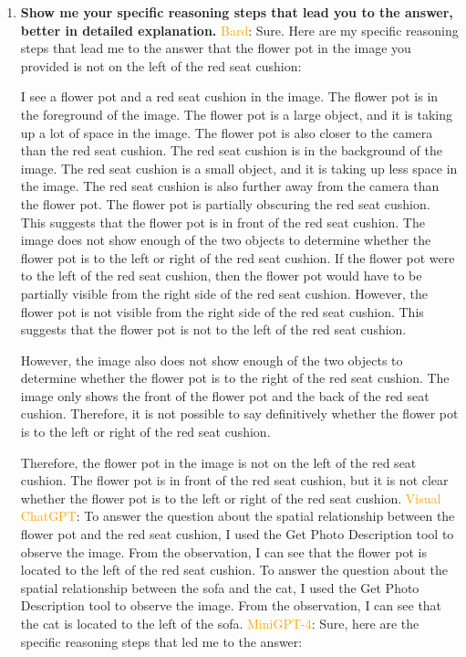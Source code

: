 \begin{enumerate}
    It is possible that the flower pot is to the left of the red seat cushion, but it is also possible that the flower pot is to the right of the red seat cushion. The image does not provide enough information to determine the answer definitively.
    \subitem \textcolor{orange}{Visual ChatGPT}: Yes, the flower pot is on the left of the red seat cushion.
    \subitem \textcolor{orange}{MiniGPT-4}: No, the flower pot is on the right of the red seat cushion.
    \item \textbf{Show me your specific reasoning steps that lead you to the answer, better in detailed explanation.}
    \subitem \textcolor{orange}{Bard}: Sure. Here are my specific reasoning steps that lead me to the answer that the flower pot in the image you provided is not on the left of the red seat cushion:

    I see a flower pot and a red seat cushion in the image.
    The flower pot is in the foreground of the image. The flower pot is a large object, and it is taking up a lot of space in the image. The flower pot is also closer to the camera than the red seat cushion.
    The red seat cushion is in the background of the image. The red seat cushion is a small object, and it is taking up less space in the image. The red seat cushion is also further away from the camera than the flower pot.
    The flower pot is partially obscuring the red seat cushion. This suggests that the flower pot is in front of the red seat cushion.
    The image does not show enough of the two objects to determine whether the flower pot is to the left or right of the red seat cushion.
    If the flower pot were to the left of the red seat cushion, then the flower pot would have to be partially visible from the right side of the red seat cushion. However, the flower pot is not visible from the right side of the red seat cushion. This suggests that the flower pot is not to the left of the red seat cushion.
    
    However, the image also does not show enough of the two objects to determine whether the flower pot is to the right of the red seat cushion. The image only shows the front of the flower pot and the back of the red seat cushion. Therefore, it is not possible to say definitively whether the flower pot is to the left or right of the red seat cushion.
    
    Therefore, the flower pot in the image is not on the left of the red seat cushion. The flower pot is in front of the red seat cushion, but it is not clear whether the flower pot is to the left or right of the red seat cushion.
    \subitem \textcolor{orange}{Visual ChatGPT}: To answer the question about the spatial relationship between the flower pot and the red seat cushion, I used the Get Photo Description tool to observe the image. From the observation, I can see that the flower pot is located to the left of the red seat cushion. To answer the question about the spatial relationship between the sofa and the cat, I used the Get Photo Description tool to observe the image. From the observation, I can see that the cat is located to the left of the sofa.
    \subitem \textcolor{orange}{MiniGPT-4}: Sure, here are the specific reasoning steps that led me to the answer:


\end{enumerate}
